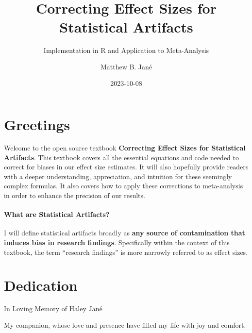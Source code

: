 \documentclass[
  letterpaper,
  DIV=11,
  numbers=noendperiod]{scrreprt}
\title{Correcting Effect Sizes for Statistical Artifacts}
\subtitle{Implementation in R and Application to Meta-Analysis}
\author{Matthew B. Jané}
\date{2023-10-08}
\renewcommand*\contentsname{Table of contents}
\newcommand\contentsname{Table of contents}
\begin{document}
\maketitle
\ifdefined\Shaded\renewenvironment{Shaded}{\begin{tcolorbox}[borderline west={3pt}{0pt}{shadecolor}, enhanced, frame hidden, sharp corners, interior hidden, breakable, boxrule=0pt]}{\end{tcolorbox}}\fi

\renewcommand*\contentsname{Table of contents}
{
\hypersetup{linkcolor=}
\setcounter{tocdepth}{2}
\tableofcontents
}

\hypertarget{greetings}{%
\chapter{Greetings}\label{greetings}}

Welcome to the open source textbook \textbf{Correcting Effect Sizes for
Statistical Artifacts}. This textbook covers all the essential equations
and code needed to correct for biases in our effect size estimates. It
will also hopefully provide readers with a deeper understanding,
appreciation, and intuition for these seemingly complex formulas. It
also covers how to apply these corrections to meta-analysis in order to
enhance the precision of our results.

\hypertarget{what-are-statistical-artifacts}{%
\subsubsection*{What are Statistical
Artifacts?}\label{what-are-statistical-artifacts}}

I will define statistical artifacts broadly as \textbf{any source of
contamination that induces bias in research findings}. Specifically
within the context of this textbook, the term ``research findings'' is
more narrowly referred to as effect sizes.


\hypertarget{dedication}{%
\chapter{Dedication}\label{dedication}}

In Loving Memory of Haley Jané

My companion, whose love and presence have filled my life with joy and
comfort.
\end{document}
